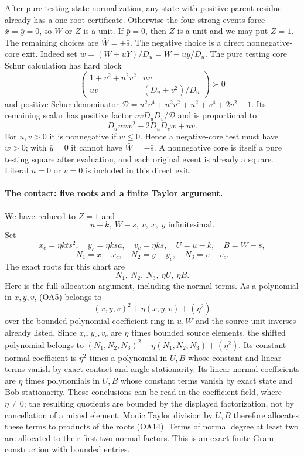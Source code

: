 After pure testing state normalization, any state with positive
parent residue already has a one-root certificate. Otherwise the
four strong events force $\bar x=\bar y=0$, so $W$ or $Z$ is a unit.
If $\bar p=0$, then $Z$ is a unit and we may put $Z=1$.
The remaining choices are $\bar W=\pm\bar s$. The negative choice
is a direct nonnegative-core exit. Indeed set
$w=(W+uY)/D_u=W-uy/D_u$. The pure testing core Schur calculation has hard block
\[
 \begin{pmatrix}1+v^2+u^2v^2&uv\\uv&(D_u+v^2)/D_u\end{pmatrix}\succ0
\]
and positive Schur denominator
$\mathcal D=u^2v^4+u^2v^2+u^2+v^4+2v^2+1$.
Its remaining scalar has positive factor $uvD_uD_v/\mathcal D$
and is proportional to
\[
 D_uuv w^2-2D_uD_vw+uv.
\]
For $u,v>0$ it is nonnegative if $w\leq0$. Hence a negative-core
test must have $w>0$; with $\bar y=0$ it cannot have
$\bar W=-\bar s$. A nonnegative core is itself a pure testing
square after evaluation, and each original event is already a square.
Literal $u=0$ or $v=0$ is included in this direct exit.

\paragraph{The contact: five roots and a finite Taylor argument.}
We have reduced to $Z=1$ and
\[
 u-k,\ W-s,\ v,\ x,\ y\text{ infinitesimal}.
\]
Set
\[
 x_c=\eta kts^2,\quad y_c=\eta ksa,\quad v_c=\eta ks,
\quad U=u-k,\quad B=W-s,
\]
\[
 N_1=x-x_c,\quad N_2=y-y_c,\quad N_3=v-v_c.
\]
The exact roots for this chart are
\[
                 N_1,\ N_2,\ N_3,\ \eta U,\ \eta B.   \tag{OA14}
\]
Here is the full allocation argument, including the normal terms.
As a polynomial in $x,y,v$, (OA5) belongs to
\[
              (x,y,v)^2+\eta(x,y,v)+(\eta^2)
\]
over the bounded polynomial coefficient ring in $u,W$ and the source
unit inverses already listed. Since $x_c,y_c,v_c$ are $\eta$ times
bounded source elements, the shifted polynomial belongs to
$(N_1,N_2,N_3)^2+\eta(N_1,N_2,N_3)+(\eta^2)$.
Its constant normal coefficient is $\eta^2$ times a polynomial in
$U,B$ whose constant and linear terms vanish by exact contact and
angle stationarity. Its linear normal coefficients are $\eta$ times
polynomials in $U,B$ whose constant terms vanish by exact state and
Bob stationarity. These conclusions can be read in the coefficient
field, where $\eta\ne0$; the resulting quotients are bounded by the
displayed factorization, not by cancellation of a mixed element.
Monic Taylor division by $U,B$ therefore allocates these terms to
products of the roots (OA14). Terms of normal degree at least two
are allocated to their first two normal factors. This is an exact
finite Gram construction with bounded entries.

